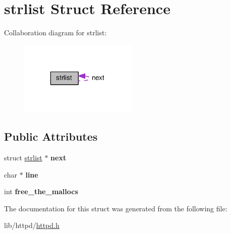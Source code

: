 \hypertarget{structstrlist}{}\section{strlist Struct Reference}
\label{structstrlist}


Collaboration diagram for strlist\+:
\nopagebreak
\begin{figure}[H]
\begin{center}
\leavevmode
\includegraphics[width=160pt]{structstrlist__coll__graph}
\end{center}
\end{figure}
\subsection*{Public Attributes}
\begin{DoxyCompactItemize}
\item 
\mbox{\label{structstrlist_a8700830b5a082a144a84d547130f7424}} 
struct \hyperlink{structstrlist}{strlist} $\ast$ {\bfseries next}
\item 
\mbox{\label{structstrlist_ab4848f974ebed630e8a406192712d951}} 
char $\ast$ {\bfseries line}
\item 
\mbox{\label{structstrlist_a58b204ceefd90a8b36b2d6af18453df8}} 
int {\bfseries free\+\_\+the\+\_\+mallocs}
\end{DoxyCompactItemize}


The documentation for this struct was generated from the following file\+:\begin{DoxyCompactItemize}
\item 
lib/httpd/\hyperlink{httpd_8h}{httpd.\+h}\end{DoxyCompactItemize}
